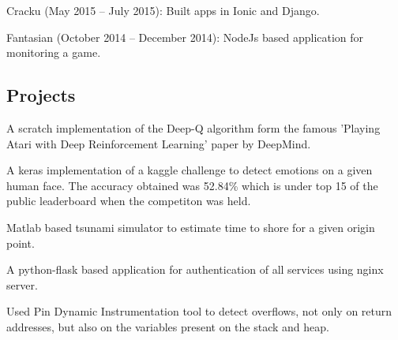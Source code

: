 \documentclass[letterpaper]{deedy-resume} %
\begin{document}
\begin{minipage}[t]{0.66\textwidth}
\sectionspace %


\begin{tightitemize}
\item Cracku (May 2015 – July 2015): Built apps in Ionic and Django.
\item Fantasian (October 2014 – December 2014): NodeJs based application for monitoring a game.
\end{tightitemize}

\vspace{\topsep} %
\subsection{Projects}
\vspace{\topsep} %
\begin{tightitemize}
\item {} A scratch implementation of the Deep-Q algorithm form the famous 'Playing Atari with Deep Reinforcement Learning' paper by DeepMind.
\item {} A keras implementation of a kaggle challenge to detect emotions on a given human face. The accuracy obtained was 52.84\% which is under top 15 of the public leaderboard when the competiton was held.
\item {} Matlab based tsunami simulator to estimate time to shore for a given origin point.
\item {} A python-flask based application for authentication of all services using nginx server.
\item {} Used Pin Dynamic Instrumentation tool to detect overflows, not only on return addresses, but also on the variables present on the stack and heap.
\item {}
\end{tightitemize}

\sectionspace %


\end{minipage} %
\end{document}

